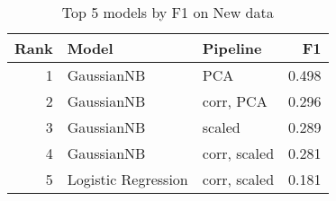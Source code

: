 \begin{table}[!htb]
\caption{Top 5 models by F1 on New data}
\label{table-top-5-f1-new}
\centering
\begin{tabular}{rllr}
\toprule
Rank & Model & Pipeline & F1 \\
\midrule
1 & GaussianNB & PCA & 0.498 \\
2 & GaussianNB & corr, PCA & 0.296 \\
3 & GaussianNB & scaled & 0.289 \\
4 & GaussianNB & corr, scaled & 0.281 \\
5 & Logistic Regression & corr, scaled & 0.181 \\
\bottomrule
\end{tabular}
\end{table}
